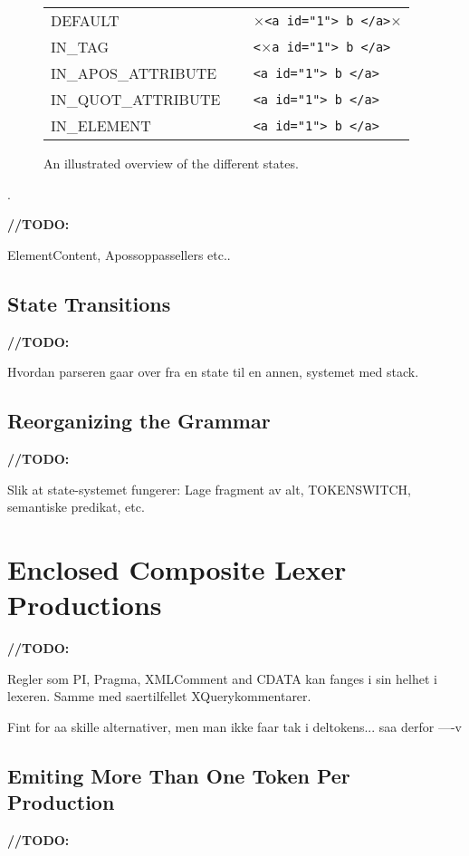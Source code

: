 \begin{figure}[h]
\centering
\begin{tabular}{ll}
DEFAULT				& \textbf{\Large $\times$}\verb!<a id="1"> b </a>!\textbf{\Large $\times$} \\
IN\_TAG				& \verb!<!\textbf{\Large $\times$}\verb!a id="1"> b </a>! \\
IN\_APOS\_ATTRIBUTE\verb!   !	& \verb!<a id="1"> b </a>! \\
IN\_QUOT\_ATTRIBUTE		& \verb!<a id="1"> b </a>! \\
IN\_ELEMENT			& \verb!<a id="1"> b </a>! \\
\end{tabular}
\caption{An illustrated overview of the different states.}
\label{fig:states}
\end{figure}
.

\textbf{\LARGE //TODO:} 

ElementContent, Apossoppassellers etc..



\subsection{State Transitions}


\textbf{\LARGE //TODO:} 

Hvordan parseren gaar over fra en state til en annen, systemet med stack.

\subsection{Reorganizing the Grammar}
\label{sect:rewriteGrammar:reorganizing}
\textbf{\LARGE //TODO:} 

Slik at state-systemet fungerer: Lage fragment av alt, TOKENSWITCH, semantiske predikat, etc.


\section{Enclosed Composite Lexer Productions}
\label{sect:rewriteGrammar:enclosedComposite}
\textbf{\LARGE //TODO:} 

Regler som PI, Pragma, XMLComment and CDATA kan fanges i sin helhet i lexeren. Samme med saertilfellet XQuerykommentarer. 

Fint for aa skille alternativer, men man ikke faar tak i deltokens... saa derfor ----v

\subsection{Emiting More Than One Token Per Production}
\textbf{\LARGE //TODO:} 

